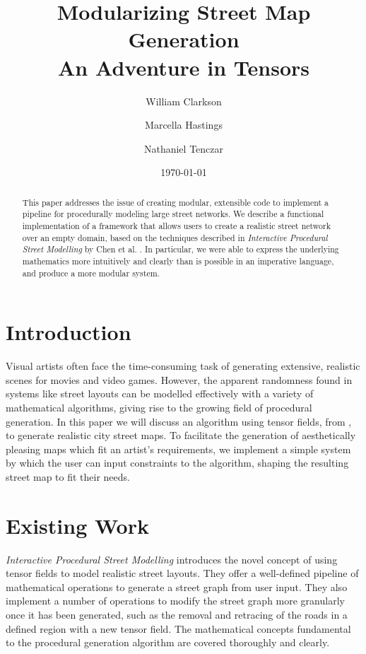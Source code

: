 \documentclass[twocolumn]{article}
\title{Modularizing Street Map Generation \\
    \vspace{8pt} \large An Adventure in Tensors}
\author{William Clarkson \and Marcella Hastings \and Nathaniel Tenczar}
\date{\today}
\begin{document}
\maketitle

\begin{abstract}
This paper addresses the issue of creating modular, extensible code to
implement a pipeline for procedurally modeling large street networks. We
describe a functional implementation of a framework that allows users to create
a realistic street network over an empty domain, based on the techniques
described in \textit{Interactive Procedural Street Modelling} by Chen et al.
\cite{chen}. In particular, we were able to express the underlying mathematics
more intuitively and clearly than is possible in an imperative language, and
produce a more modular system.
\end{abstract}

\section{Introduction}
Visual artists often face the time-consuming task of generating extensive,
realistic scenes for movies and video games. However, the apparent randomness
found in systems like street layouts can be modelled effectively with a variety
of mathematical algorithms, giving rise to the growing field of procedural
generation. In this paper we will discuss an algorithm using tensor fields,
from \cite{chen}, to generate realistic city street maps. To facilitate the
generation of aesthetically pleasing maps which fit an artist's requirements,
we implement a simple system by which the user can input constraints to the
algorithm, shaping the resulting street map to fit their needs.


\section{Existing Work}
\textit{Interactive Procedural Street Modelling} \cite{chen} introduces the
novel concept of using tensor fields to model realistic street layouts. They
offer a well-defined pipeline of mathematical operations to generate a street
graph from user input. They also implement a number of operations to modify the
street graph more granularly once it has been generated, such as the removal
and retracing of the roads in a defined region with a new tensor field. The
mathematical concepts fundamental to the procedural generation algorithm are
covered thoroughly and clearly.
\end{document}
